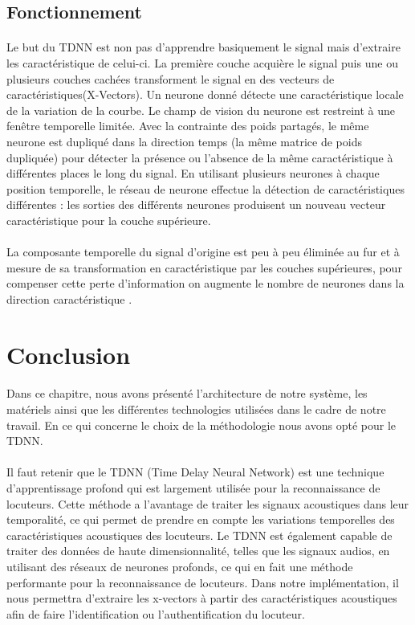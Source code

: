 \subsection{Fonctionnement }

\paragraph{}Le but du TDNN est non pas d'apprendre basiquement le signal mais d'extraire les caractéristique de celui-ci. La première couche acquière le signal puis une ou plusieurs couches cachées transforment le signal en des vecteurs de caractéristiques(X-Vectors). Un neurone donné détecte une caractéristique locale de la variation de la courbe. Le champ de vision du neurone est restreint à une fenêtre temporelle limitée. Avec la contrainte des poids partagés, le même neurone est dupliqué dans la direction temps (la même matrice de poids dupliquée) pour détecter la présence ou l'absence de la même caractéristique à différentes places le long du signal. En utilisant plusieurs neurones à chaque position temporelle, le réseau de neurone effectue la détection de caractéristiques différentes : les sorties des différents neurones produisent un nouveau vecteur caractéristique pour la couche supérieure.
\paragraph{}La composante temporelle du signal d'origine est peu à peu éliminée au fur et à mesure de sa transformation en caractéristique par les couches supérieures, pour compenser cette perte d'information on augmente le nombre de neurones dans la direction caractéristique \cite{themarvinproject}.


\section*{Conclusion}
\paragraph{}Dans ce chapitre, nous avons présenté l’architecture de notre système, les matériels ainsi que les différentes technologies utilisées dans le cadre de notre travail. En ce qui concerne le choix de la méthodologie nous avons opté pour le TDNN. 
\paragraph{}Il faut retenir que le TDNN (Time Delay Neural Network) est une technique d'apprentissage profond qui est largement utilisée pour la reconnaissance de locuteurs. Cette méthode a l'avantage de traiter les signaux acoustiques dans leur temporalité, ce qui permet de prendre en compte les variations temporelles des caractéristiques acoustiques des locuteurs. Le TDNN est également capable de traiter des données de haute dimensionnalité, telles que les signaux audios, en utilisant des réseaux de neurones profonds, ce qui en fait une méthode performante pour la reconnaissance de locuteurs. Dans notre implémentation, il nous permettra d’extraire les x-vectors à partir des caractéristiques acoustiques afin de faire l’identification ou l’authentification du locuteur.
